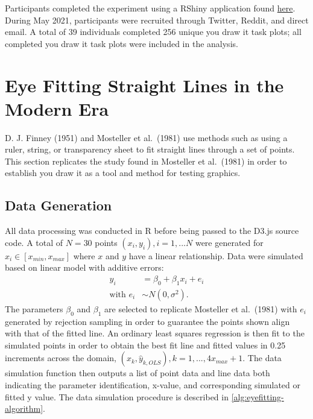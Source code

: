 \documentclass[print]{nuthesis}
\begin{document}
Participants completed the experiment using a RShiny application found \href{https://shiny.srvanderplas.com/you-draw-it/}{here}.
During May 2021, participants were recruited through Twitter, Reddit, and direct email.
A total of 39 individuals completed 256 unique you draw it task plots; all completed you draw it task plots were included in the analysis.

\hypertarget{eye-fitting-straight-lines-in-the-modern-era}{%
\section{Eye Fitting Straight Lines in the Modern Era}\label{eye-fitting-straight-lines-in-the-modern-era}}

D. J. Finney (1951) and Mosteller et al.~(1981) use methods such as using a ruler, string, or transparency sheet to fit straight lines through a set of points.
This section replicates the study found in Mosteller et al.~(1981) in order to establish you draw it as a tool and method for testing graphics.

\hypertarget{data-generation-1}{%
\subsection{Data Generation}\label{data-generation-1}}

All data processing was conducted in R before being passed to the D3.js source code.
A total of \(N = 30\) points \((x_i, y_i), i = 1,...N\) were generated for \(x_i \in [x_{min}, x_{max}]\) where \(x\) and \(y\) have a linear relationship.
Data were simulated based on linear model with additive errors:
\begin{align}
y_i & = \beta_0 + \beta_1 x_i + e_i \\
\text{with } e_i & \sim N(0, \sigma^2). \nonumber
\end{align}
The parameters \(\beta_0\) and \(\beta_1\) are selected to replicate Mosteller et al.~(1981) with \(e_i\) generated by rejection sampling in order to guarantee the points shown align with that of the fitted line.
An ordinary least squares regression is then fit to the simulated points in order to obtain the best fit line and fitted values in 0.25 increments across the domain, \((x_k, \hat y_{k,OLS}), k = 1, ..., 4 x_{max} +1\).
The data simulation function then outputs a list of point data and line data both indicating the parameter identification, x-value, and corresponding simulated or fitted y value.
The data simulation procedure is described in \cref{alg:eyefitting-algorithm}.
\end{document}
